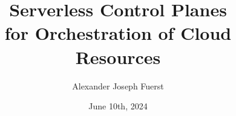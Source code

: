 \documentclass[11pt]{thesis}
\begin{document}
\title{%
  Serverless Control Planes \\ for Orchestration of Cloud Resources
  }
\author{Alexander Joseph Fuerst}
\date{June 10th, 2024}



\beforepreface

\afterpreface











% 








\cvsection
\end{document}
